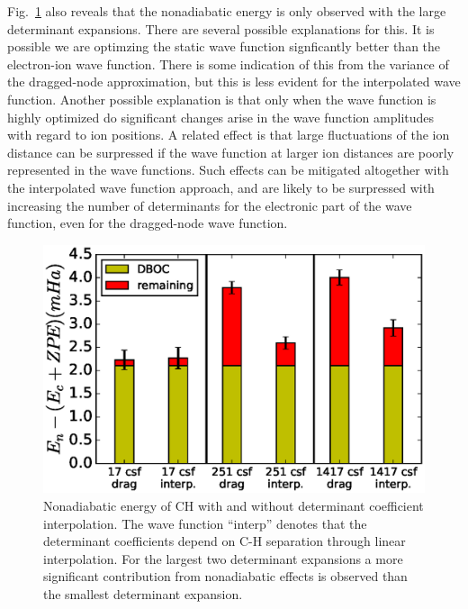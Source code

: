 \documentclass[aip,jcp,numerical,reprint]{revtex4-1}
\begin{document}
Fig.~\ref{fig:ch-interp} also reveals that the nonadiabatic energy is only observed with the large determinant expansions.  There are several possible explanations for this.  It is possible we are optimzing the static wave function signficantly better than the electron-ion wave function.  There is some indication of this from the variance of the dragged-node approximation, but this is less evident for the interpolated wave function.  Another possible explanation is that only when the wave function is highly optimized do significant changes arise in the wave function amplitudes with regard to ion positions.  A related effect is that large fluctuations of the ion distance can be surpressed if the wave function at larger ion distances are poorly represented in the wave functions.  Such effects can be mitigated altogether with the interpolated wave function approach, and are likely to be surpressed with increasing the number of determinants for the electronic part of the wave function, even for the dragged-node wave function.  %

\begin{figure}[h]
\includegraphics[scale=0.5]{ch-only}
\caption{Nonadiabatic energy of CH with and without determinant coefficient interpolation.  The wave function ``interp'' denotes that the determinant coefficients depend on C-H separation through linear interpolation. For the largest two determinant expansions a more significant contribution from nonadiabatic effects is observed than the smallest determinant expansion. \label{fig:ch-interp} }
\end{figure}
\end{document}
